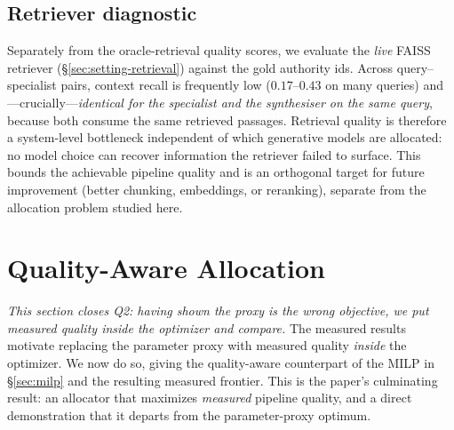 \documentclass[11pt]{article}
\begin{document}
\subsection{Retriever diagnostic}
\label{sec:quality-retriever}
Separately from the oracle-retrieval quality scores, we evaluate the \emph{live}
FAISS retriever (§\ref{sec:setting-retrieval}) against the gold authority ids.
Across query--specialist pairs, context recall is frequently low
($0.17$--$0.43$ on many queries) and---crucially---\emph{identical for the
specialist and the synthesiser on the same query}, because both consume the same
retrieved passages. Retrieval quality is therefore a system-level bottleneck
independent of which generative models are allocated: no model choice can recover
information the retriever failed to surface. This bounds the achievable pipeline
quality and is an orthogonal target for future improvement (better chunking,
embeddings, or reranking), separate from the allocation problem studied here.

\section{Quality-Aware Allocation}
\label{sec:qmilp}
\emph{This section closes Q2: having shown the proxy is the wrong objective, we put
measured quality \emph{inside} the optimizer and compare.}
The measured results motivate replacing the parameter proxy with measured quality
\emph{inside} the optimizer. We now do so, giving the quality-aware counterpart of
the MILP in §\ref{sec:milp} and the resulting measured frontier. This is the
paper's culminating result: an allocator that maximizes \emph{measured} pipeline
quality, and a direct demonstration that it departs from the parameter-proxy
optimum.
\end{document}

